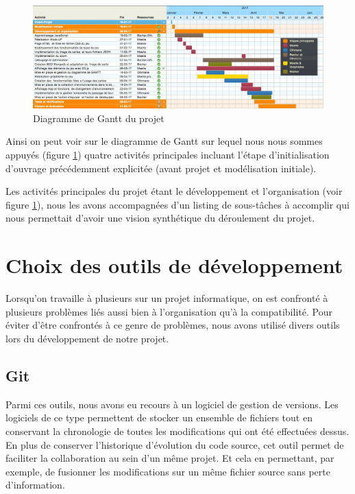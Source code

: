 \documentclass[12pt]{report}
\begin{document}
		\begin{figure}[h!]
    	\centering
	    \includegraphics[scale=0.3]{diagrammeGantt.jpg}
	    \caption{Diagramme de Gantt du projet}
	    \label{fig:diagGantt}
    \end{figure}

		\newpage
		Ainsi on peut voir sur le diagramme de Gantt sur lequel nous nous sommes appuyés (figure \ref{fig:diagGantt}) quatre activités principales incluant l’étape d’initialisation d’ouvrage précédemment explicitée (avant projet et modélisation initiale).

		Les activités principales du projet étant le développement et l'organisation (voir figure \ref{fig:diagGantt}), nous les avons accompagnées d’un listing de sous-tâches à accomplir qui nous permettait d’avoir une vision synthétique du déroulement du projet.

		\newpage

		\section{Choix des outils de développement}
		Lorsqu’on travaille à plusieurs sur un projet informatique, on est confronté à plusieurs problèmes liés aussi bien à l’organisation qu’à la compatibilité.
		Pour éviter d'être confrontés à ce genre de problèmes, nous avons utilisé divers outils lors du développement de notre projet.

			\subsection*{Git}
	 		Parmi ces outils, nous avons eu recours à un logiciel de gestion de versions. Les logiciels de ce type permettent  de stocker un ensemble de fichiers tout en conservant la chronologie de toutes les modifications qui ont été effectuées dessus.
	 		En plus de conserver l’historique d’évolution du code source, cet outil permet de faciliter la collaboration au sein d’un même projet. Et cela en permettant, par exemple, de fusionner les modifications sur un même fichier source sans perte d’information.
\end{document}
